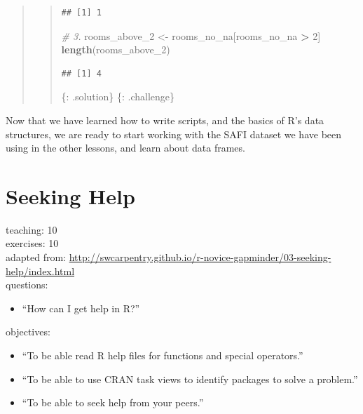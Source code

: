 \documentclass[]{book}
\newenvironment{Shaded}{\begin{snugshade}}{\end{snugshade}}
\newcommand{\KeywordTok}[1]{\textcolor[rgb]{0.13,0.29,0.53}{\textbf{#1}}}
\newcommand{\DecValTok}[1]{\textcolor[rgb]{0.00,0.00,0.81}{#1}}
\newcommand{\StringTok}[1]{\textcolor[rgb]{0.31,0.60,0.02}{#1}}
\newcommand{\CommentTok}[1]{\textcolor[rgb]{0.56,0.35,0.01}{\textit{#1}}}
\newcommand{\OperatorTok}[1]{\textcolor[rgb]{0.81,0.36,0.00}{\textbf{#1}}}
\newcommand{\NormalTok}[1]{#1}
\providecommand{\tightlist}{%
  \setlength{\itemsep}{0pt}\setlength{\parskip}{0pt}}
\begin{document}
\begin{quote}
\begin{quote}
\begin{verbatim}
## [1] 1
\end{verbatim}

\begin{Shaded}
\begin{Highlighting}[]
\CommentTok{# 3.}
\NormalTok{rooms_above_}\DecValTok{2}\NormalTok{ <-}\StringTok{ }\NormalTok{rooms_no_na[rooms_no_na }\OperatorTok{>}\StringTok{ }\DecValTok{2}\NormalTok{]}
\KeywordTok{length}\NormalTok{(rooms_above_}\DecValTok{2}\NormalTok{)}
\end{Highlighting}
\end{Shaded}

\begin{verbatim}
## [1] 4
\end{verbatim}

\{: .solution\} \{: .challenge\}
\end{quote}
\end{quote}

Now that we have learned how to write scripts, and the basics of R's
data structures, we are ready to start working with the SAFI dataset we
have been using in the other lessons, and learn about data frames.

\chapter{Seeking Help}\label{seeking-help}

teaching: 10\\
exercises: 10\\
adapted from:
\url{http://swcarpentry.github.io/r-novice-gapminder/03-seeking-help/index.html}\\
questions:

\begin{itemize}
\tightlist
\item
  ``How can I get help in R?''
\end{itemize}

objectives:

\begin{itemize}
\tightlist
\item
  ``To be able read R help files for functions and special
  operators.''\\
\item
  ``To be able to use CRAN task views to identify packages to solve a
  problem.''\\
\item
  ``To be able to seek help from your peers.''
\end{itemize}
\end{document}
